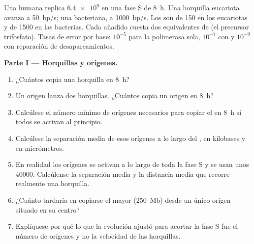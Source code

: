 \begin{problem}
\label{pb:b1:replication-mitosis:1}
Una  humana replica $\num{6.4e9}$  en una fase S de
\qty{8}{h}. Una horquilla eucariota avanza a \qty{50}{bp/s}; una bacteriana,
a \qty{1000}{bp/s}. Los  son de \qty{150}{} 
en los eucariotas y de \qty{1500}{} en las bacterias. Cada 
añadido cuesta dos equivalentes de  (el precursor trifosfato). Tasas de
error por base: $10^{-5}$ para la polimerasa sola, $10^{-7}$ con  y $10^{-9}$ con reparación de desapareamientos.

\medskip
\noindent\textbf{Parte I --- Horquillas y orígenes.}
\begin{enumerate}
  \item ¿Cuántos  copia una horquilla en \qty{8}{h}?
  \item Un origen lanza dos horquillas. ¿Cuántos  copia un
        origen en \qty{8}{h}?
  \item Calcúlese el número mínimo de orígenes necesarios para copiar el
         en \qty{8}{h} si todos se activan al principio.
  \item Calcúlese la separación media de esos orígenes a lo largo del ,
        en kilobases y en micrómetros.
  \item En realidad los orígenes se activan a lo largo de toda la fase S y
        se usan unos \num{40000}. Calcúlense la separación media y la
        distancia media que recorre realmente una horquilla.
  \item ¿Cuánto tardaría en copiarse el  mayor (\qty{250}{Mb})
        desde un único origen situado en su centro?
  \item Explíquese por qué lo que la evolución ajustó para acortar la fase
        S fue el número de orígenes y no la velocidad de las horquillas.
\end{enumerate}


\end{problem}
